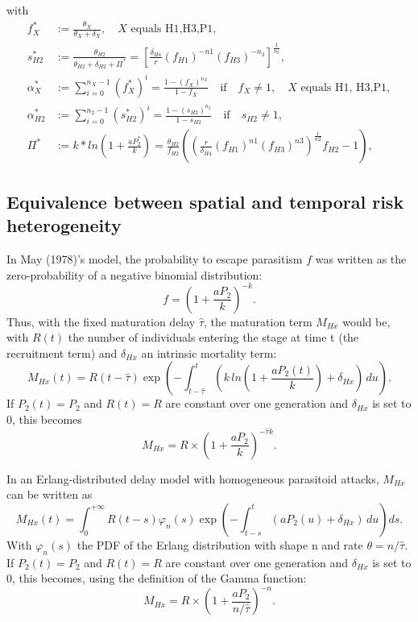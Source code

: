 \documentclass[12pt,a4paper,onecolumn]{article}
\begin{document}
with
 \begin{align}
  f_X^* &:= \frac{\theta_X}{\theta_X + \delta_X}, \quad \text{$X$ equals H1,H3,P1}, \nonumber \\
  s_{H2}^* &:= \frac{\theta_{H2}}{\theta_{H2} + \delta_{H2} + \Pi^*} = [\frac{\delta_{H4}}{r}(f_{H1})^{-n1}(f_{H3})^{-n_3}]^{\frac{1}{n_2}}, \nonumber \\
  \alpha_X^* &:= \sum_{i=0}^{n_X-1} (f_X^*)^i = \frac{1-(f_X)^{n_X}}{1-f_X} \quad \text{if} \quad f_X \neq 1,  \quad \text{$X$ equals H1, H3,P1}, \\
  \alpha_{H2}^* &:= \sum_{i=0}^{n_2-1} (s_{H2}^*)^i = \frac{1-(s_{H2})^{n_2}}{1-s_{H2}} \quad \text{if} \quad s_{H2} \neq 1,\nonumber \\
  \Pi^* &:= k*ln(1+\frac{aP_2^*}{k}) = \frac{\theta_{H2}}{f_{H2}} ((\frac{r}{\delta_{H4}}(f_{H1})^{n1}(f_{H3})^{n3})^{\frac{1}{n2}}f_{H2} -1), \nonumber 
 \end{align}

\subsection{Equivalence between spatial and temporal risk heterogeneity}
In May (1978)'s model, the probability to escape parasitism $f$ was written as the zero-probability of a negative binomial distribution: 
\[ f = \left(1 + \frac{a P_2}{k} \right)^{-k}.\]
Thus, with the fixed maturation delay $\hat \tau$, the maturation term $M_{Hx}$ would be, with $R(t)$ the number of individuals entering the stage at time t (the recruitment term) and $\delta_{Hx}$ an intrinsic mortality term:
\[ M_{Hx}(t)  = R(t-\hat \tau)  \exp\left( -\int_{t- \hat \tau}^{t} (k \, ln\left(1+\frac{a P_2(t)}{k}\right) + \delta_{Hx}) \, du \right).\]
If $P_2(t) = P_2$ and $R(t)=R$ are constant over one generation and $\delta_{Hx}$ is set to 0, this becomes
\[ M_{Hx}  = R \times \left(1+\frac{a P_2}{k}\right)^{-\hat \tau k}.\]

In an Erlang-distributed delay model with homogeneous parasitoid attacks, $M_{Hx}$ can be written as
\[ M_{Hx}(t)  = \int_0^{+\infty} R(t-s)\varphi_n(s) \exp\left( -\int_{t-s}^{t} (a P_2(u) + \delta_{Hx}) \, du \right) ds. \]
With $\varphi_n(s)$ the PDF of the Erlang distribution with shape n and rate $\theta = n/\hat \tau$. If $P_2(t) = P_2$ and $R(t)=R$ are constant over one generation and $\delta_{Hx}$ is set to 0, this becomes, using the definition of the Gamma function:
\[ M_{Hx}  = R \times \left(1+\frac{a P_2}{n/ \hat \tau}\right)^{-n}.\]
\end{document}
